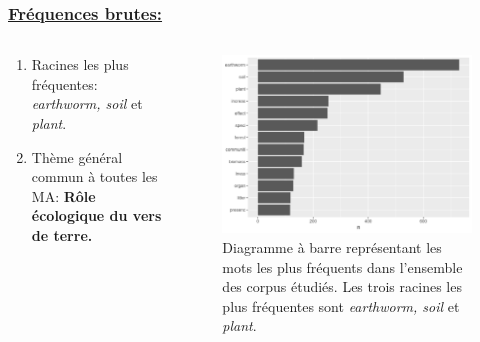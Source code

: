 \documentclass[xcolor=dvipsnames]{beamer}
\begin{document}
	\begin{frame}
		\frametitle{\underline{Fréquences brutes:}} 
		\begin{columns}
			\begin{column}{0.5\textwidth} %
				\begin{enumerate}
					\item Racines les plus fréquentes: \textit{earthworm, soil} et \textit{plant}.
					\item Thème général commun à toutes les MA: \textbf{Rôle écologique du vers de terre.}
				\end{enumerate}
			\end{column}
			\begin{column}{0.5\textwidth}
				\begin{figure}[htb] %
					\begin{center} %
						\includegraphics[width=1\textwidth]{freq_all_MA.png}
						\caption{Diagramme à barre représentant les mots les plus fréquents dans l'ensemble des corpus étudiés. Les trois racines les plus fréquentes sont \textit{earthworm, soil} et \textit{plant}.}\label{all_freq}
					\end{center}
				\end{figure}
			\end{column}
		\end{columns}
	\end{frame}
\end{document}
